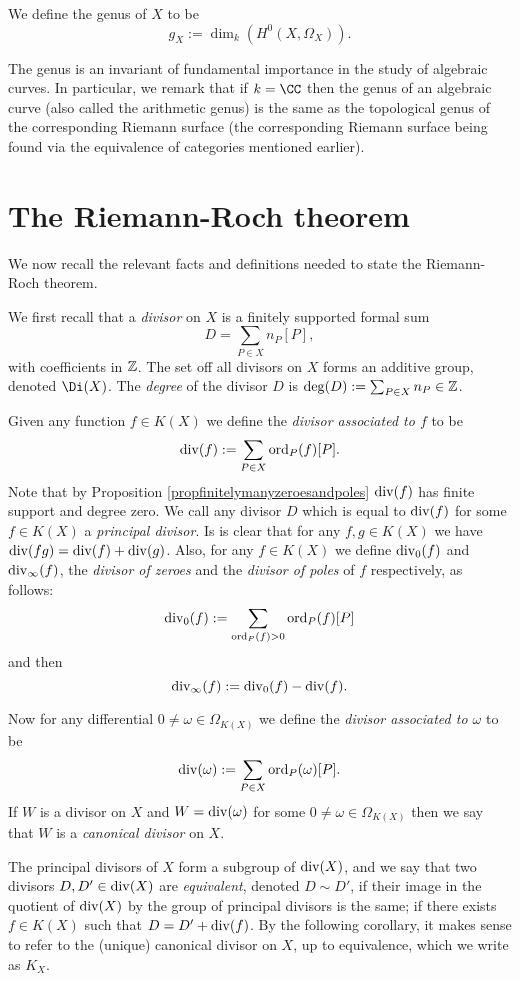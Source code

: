     \begin{defn}\label{definitiongenus}
    We define the genus of $X$ to be
        \[
        g_X := \dim_k \left( H^0(X,\Omega_X)\right).
        \]
    \end{defn}

The genus is an invariant of fundamental importance in the study of algebraic curves.
In particular, we remark that if $k = \CC$ then the genus of an algebraic curve (also called the arithmetic genus) is the same as the topological genus of the corresponding Riemann surface (the corresponding Riemann surface being found via the equivalence of categories mentioned earlier).

\section{The Riemann-Roch theorem}

We now recall the relevant facts and definitions needed to state the Riemann-Roch theorem.

We first recall that a \emph{divisor} on $X$ is a finitely supported formal sum 
    \[
    D = \sum_{P \in X} n_P[P],
    \]
with coefficients in ${\mathbb Z}$.
The set off all divisors on $X$ forms an additive group, denoted $\Di (X)$.
The \emph{degree} of the divisor $D$ is $\deg(D) := \sum_{P \in X} n_P \in {\mathbb Z}$.


Given any function $f \in K(X)$ we define the \emph{divisor associated to $f$} to be
    \[
    \operatorname{div}(f) := \sum_{P \in X} \operatorname{ord}_P(f) [P].
    \]
Note that by Proposition \ref{propfinitelymanyzeroesandpoles} $\operatorname{div}(f)$ has finite support and degree zero.
We call any divisor $D$ which is equal to $\operatorname{div}(f)$ for some $f \in K(X)$ a \emph{principal divisor}.
Is is clear that for any $f, g \in K(X)$ we have $\operatorname{div}(fg) = \operatorname{div}(f) + \operatorname{div}(g)$.
Also, for any $f \in K(X)$ we define $\operatorname{div}_0(f)$ and $\operatorname{div}_\infty (f)$, the \emph{divisor of zeroes} and the \emph{divisor of poles} of $f$ respectively, as follows:
    \[
    \operatorname{div}_0(f) := \sum_{\operatorname{ord}_P(f) >0} \operatorname{ord}_P(f)[P]
    \]
and then
    \[
    \operatorname{div}_\infty(f) := \operatorname{div}_0(f) - \operatorname{div}(f).
    \]

Now for any differential $0 \neq \omega \in \Omega_{K(X)}$ we define the \emph{divisor associated to $\omega$} to be
    \[
    \operatorname{div}(\omega) := \sum_{P \in X} \operatorname{ord}_P(\omega)[P].
    \]
If $W$ is a divisor on $X$ and $W = \operatorname{div}(\omega)$ for some $ 0 \neq \omega \in \Omega_{K(X)}$ then we say that $W$ is a \emph{canonical divisor} on $X$.

The principal divisors of $X$ form a subgroup of $\operatorname{div}(X)$, and we say that two divisors $D, D' \in \operatorname{div}(X)$ are \emph{equivalent}, denoted $D \sim D'$, if their image in the quotient of $\operatorname{div}(X)$ by the group of principal divisors is the same; \ie if there exists $f \in K(X)$ such that $ D = D' + \operatorname{div}(f)$.
By the following corollary, it makes sense to refer to the (unique) canonical divisor on $X$, up to equivalence, which we write as $K_X$.

